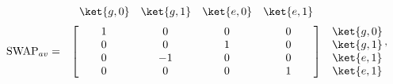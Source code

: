 \documentclass[a4paper,11pt]{article} %
\begin{document}
\begin{equation*} \label{ec_ions_SWAPav}
 \begin{matrix}
    & 
    \begin{matrix}
      \ket{g,0} & 
      \ket{g,1} & 
      \ket{e,0} &
      \ket{e,1}
    \end{matrix} 	&  \\[.5\normalbaselineskip]
    \text{SWAP}_{av} = & 
    \begin{bmatrix}
        \makebox[\widthof{$\ket{g,0}$}]{$1$} & 
        \makebox[\widthof{$\ket{g,0}$}]{$0$} & 
        \makebox[\widthof{$\ket{g,0}$}]{$0$} & 
        \makebox[\widthof{$\ket{g,0}$}]{$0$} \\
        \makebox[\widthof{$\ket{g,0}$}]{$0$} & 
        \makebox[\widthof{$\ket{g,0}$}]{$0$} & 
        \makebox[\widthof{$\ket{g,0}$}]{$1$} & 
        \makebox[\widthof{$\ket{g,0}$}]{$0$} \\
        \makebox[\widthof{$\ket{g,0}$}]{$0$} & 
        \makebox[\widthof{$\ket{g,0}$}]{$-1$} & 
        \makebox[\widthof{$\ket{g,0}$}]{$0$} & 
        \makebox[\widthof{$\ket{g,0}$}]{$0$} \\
        \makebox[\widthof{$\ket{g,0}$}]{$0$} & 
        \makebox[\widthof{$\ket{g,0}$}]{$0$} & 
        \makebox[\widthof{$\ket{g,0}$}]{$0$} & 
        \makebox[\widthof{$\ket{g,0}$}]{$1$} \\
    \end{bmatrix} &
    \begin{matrix} \ket{g,0} \\ \ket{g,1} \\ \ket{e,1} \\ \ket{e,1} \end{matrix} 
\end{matrix} \,,
\end{equation*}
\end{document}
